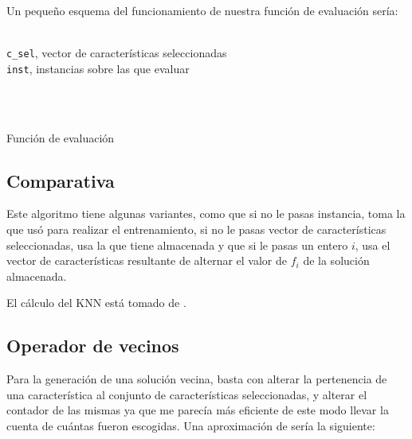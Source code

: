 \documentclass[a4paper, 11pt]{article}
\begin{document}
			Un pequeño esquema del funcionamiento de nuestra función de evaluación sería:

			\begin{algorithm}[H]
				\begin{algorithmic}[1]

					\REQUIRE \ \\
			        	\texttt{c\_sel}, vector de características seleccionadas\\
			        	\texttt{inst}, instancias sobre las que evaluar\\ \

			     	\\
						\ELSE
						\ENDIF
				  		
						\ENDIF
					\ENDFOR
				  
				\end{algorithmic}
			    \caption{Función de evaluación}
			    \label{Evaluate}

		\subsection{Comparativa}
			
			\end{algorithm}
			
			Este algoritmo tiene algunas variantes, como que si no le pasas instancia, toma la que
			usó para realizar el entrenamiento, si no le pasas vector de características seleccionadas,
			usa la que tiene almacenada y que si le pasas un entero $i$, usa el vector de características
			resultante de alternar el valor de $f_i$ de la solución almacenada.
			
			El cálculo del KNN está tomado de \cite{KNN}.
		
		\subsection{Operador de vecinos}
			Para la generación de una solución vecina, basta con alterar la pertenencia de una
			característica al conjunto de características seleccionadas, y alterar el contador
			de las mismas ya que me parecía más eficiente de este modo llevar la cuenta de cuántas
			fueron escogidas. Una aproximación de sería la siguiente:
			
\end{document}
